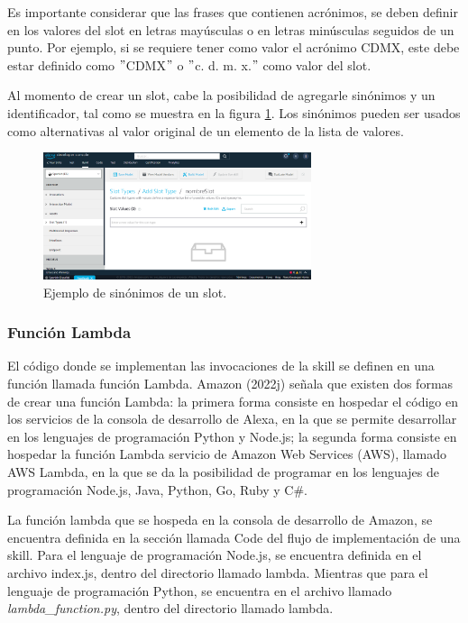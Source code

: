 Es importante considerar que las frases que contienen acrónimos, se deben definir en los valores del slot en letras mayúsculas o en letras minúsculas seguidos de un punto. Por ejemplo, si se requiere tener como valor el acrónimo CDMX, este debe estar definido como $"$CDMX$"$ o $"$c. d. m. x.$"$ como valor del slot.

Al momento de crear un slot, cabe la posibilidad de agregarle sinónimos y un identificador, tal como se muestra en la figura \ref{fig:410}. Los sinónimos pueden ser usados como alternativas al valor original de un elemento de la lista de valores.

\begin{figure}
  \centering
  \includegraphics[width=0.70\textwidth]{Cap4/Figuras/SlotTypesCreation.png}
  \caption{Ejemplo de sinónimos de un slot.}
  \label{fig:410}
\end{figure}


\subsubsection{Función Lambda}
\label{FuncionLambdacapIV}

El código donde se implementan las invocaciones de la skill se definen en una función llamada función Lambda. Amazon (2022j) señala que existen dos formas de crear una función Lambda: la primera forma consiste en hospedar el código en los servicios de la consola de desarrollo de Alexa, en la que se permite desarrollar en los lenguajes de programación Python y Node.js; la segunda forma consiste en hospedar la función Lambda servicio de Amazon Web Services (AWS), llamado AWS Lambda, en la que se da la posibilidad de programar en los lenguajes de programación Node.js, Java, Python, Go, Ruby y C\#.

La función lambda que se hospeda en la consola de desarrollo de Amazon, se encuentra definida en la sección llamada Code del flujo de implementación de una skill. Para el lenguaje de programación Node.js, se encuentra definida en el archivo index.js, dentro del directorio llamado lambda. Mientras que para el lenguaje de programación Python, se encuentra en el archivo llamado \textit{lambda\_function.py}, dentro del directorio llamado lambda.


